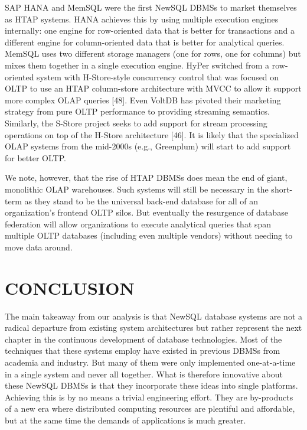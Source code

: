 \documentclass[a4paper,11pt,twoside,openright]{article}
\begin{document}
SAP HANA and MemSQL were the first NewSQL DBMSs to market themselves as
HTAP systems. HANA achieves this by using multiple execution engines
internally: one engine for row-oriented data that is better for
transactions and a different engine for column-oriented data that is
better for analytical queries. MemSQL uses two different storage
managers (one for rows, one for columns) but mixes them together in a
single execution engine. HyPer switched from a row-oriented system with
H-Store-style concurrency control that was focused on
OLTP to use an HTAP column-store architecture with MVCC to allow it
support more complex OLAP queries {[}48{]}. Even VoltDB has pivoted
their marketing strategy from pure OLTP performance to providing
streaming semantics. Similarly, the S-Store project seeks to add support
for stream processing operations on top of the H-Store architecture
{[}46{]}. It is likely that the specialized OLAP systems from the
mid-2000s (e.g., Greenplum) will start to add support for better OLTP.

We note, however, that the rise of HTAP DBMSs does mean the end of
giant, monolithic OLAP warehouses. Such systems will still be necessary
in the short-term as they stand to be the universal back-end database
for all of an organization's frontend OLTP silos. But eventually the
resurgence of database federation will allow organizations to execute
analytical queries that span multiple OLTP databases (including even
multiple vendors) without needing to move data around.

\hypertarget{conclusion}{%
\section{CONCLUSION}\label{conclusion}}

The main takeaway from our analysis is that NewSQL database systems are
not a radical departure from existing system architectures but rather
represent the next chapter in the continuous development of database
technologies. Most of the techniques that these systems employ have
existed in previous DBMSs from academia and industry. But many of them
were only implemented one-at-a-time in a single system and never all
together. What is therefore innovative about these NewSQL DBMSs is that
they incorporate these ideas into single platforms. Achieving this is by
no means a trivial engineering effort. They are by-products of a new era
where distributed computing resources are plentiful and affordable, but
at the same time the demands of applications is much greater.
\end{document}
